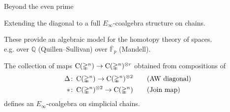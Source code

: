 
\begin{frame}[t]{Beyond the even prime}

	\pause

	Extending the diagonal to a full \textcolor{pblue}{$E_\infty$-coalgebra} structure on chains.

	\smallskip\pause

	These provide an algebraic model for the homotopy theory of spaces.\\ e.g. over $\mathbb Q$ (Quillen--Sullivan) over $\overline{\mathbb F}_p$ (Mandell).

	\smallskip\pause

	\begin{theorem}[Med.]
		The collection of maps $\operatorname{C}(\mathbb{\Delta}^n) \to \operatorname{C}(\mathbb{\Delta}^n)^{\otimes r}$ obtained from compositions of
		\begin{align*}
		\Delta &\colon \operatorname{C}(\mathbb{\Delta}^n) \to \operatorname{C}(\mathbb{\Delta}^n)^{\otimes 2}
		\qquad \text{(AW diagonal)} \\
		\ast &\colon \operatorname{C}(\mathbb{\Delta}^n)^{\otimes 2} \to \operatorname{C}(\mathbb{\Delta}^n)
		\qquad \text{(Join map)}
		\end{align*}
		defines an $E_\infty$-coalgebra on simplicial chains.
	\end{theorem}

	\pause


	\medskip\pause

\end{frame}

